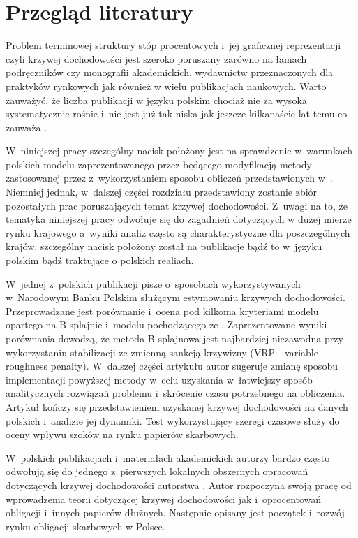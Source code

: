 \documentclass[12pt,a4paper,twoside,openany]{book}
\begin{document}
\section{Przegląd literatury}
\label{sec:literat}

Problem terminowej struktury stóp procentowych i~jej graficznej reprezentacji czyli krzywej dochodowości jest szeroko poruszany zarówno na łamach podręczników czy monografii akademickich, wydawnictw przeznaczonych dla praktyków rynkowych jak również w wielu publikacjach naukowych. Warto zauważyć, że liczba publikacji w języku polskim chociaż nie za wysoka systematycznie rośnie i~nie jest już tak niska jak jeszcze kilkanaście lat temu co zauważa \citet{swieton2002}.

W~niniejszej pracy szczególny nacisk położony jest na sprawdzenie w~warunkach polskich modelu zaprezentowanego przez \citet{dieboldli2005} będącego modyfikacją metody zastosowanej przez \citet{nelsonsiegelli1987} z~wykorzystaniem sposobu obliczeń przedstawionych w~\citet{dieboldiinni2005}. Niemniej jednak, w~dalszej części rozdziału przedstawiony zostanie zbiór pozostałych prac poruszających temat krzywej dochodowości. Z~uwagi na to, że tematyka niniejszej pracy odwołuje się do zagadnień dotyczących w dużej mierze rynku krajowego a~wyniki analiz często są charakterystyczne dla poszczególnych krajów, szczególny nacisk położony został na publikacje bądź to w~języku polskim bądź traktujące o polskich realiach.

W~jednej z~polskich publikacji \citet{marciniak2006} pisze o~sposobach wykorzystywanych w~Narodowym Banku Polskim służącym estymowaniu krzywych dochodowości. Przeprowadzane jest porównanie i~ocena pod kilkoma kryteriami modelu opartego na B-splajnie i~modelu pochodzącego ze \citet{svensson1994}. Zaprezentowane wyniki porównania dowodzą, że metoda B-splajnowa jest najbardziej niezawodna przy wykorzystaniu stabilizacji ze zmienną sankcją krzywizny (VRP - variable roughness penalty). W~dalszej części artykułu autor sugeruje zmianę sposobu implementacji powyższej metody w~celu uzyskania w~łatwiejszy sposób analitycznych rozwiązań problemu i~skrócenie czasu potrzebnego na obliczenia. Artykuł kończy się przedstawieniem uzyskanej krzywej dochodowości na danych polskich i~analizie jej dynamiki. Test wykorzystujący szeregi czasowe służy do oceny wpływu szoków na rynku papierów skarbowych.

W~polskich publikacjach i~materiałach akademickich autorzy bardzo często odwołują się do jednego z~pierwszych lokalnych obszernych opracowań dotyczących krzywej dochodowości autorstwa \citet{swieton2002}. Autor rozpoczyna swoją pracę od wprowadzenia teorii dotyczącej krzywej dochodowości jak i~oprocentowań obligacji i~innych papierów dłużnych. Następnie opisany jest początek i~rozwój rynku obligacji skarbowych w Polsce.
\end{document}
